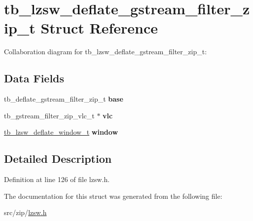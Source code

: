 \hypertarget{structtb__lzsw__deflate__gstream__filter__zip__t}{\section{tb\-\_\-lzsw\-\_\-deflate\-\_\-gstream\-\_\-filter\-\_\-zip\-\_\-t Struct Reference}
\label{structtb__lzsw__deflate__gstream__filter__zip__t}
}


Collaboration diagram for tb\-\_\-lzsw\-\_\-deflate\-\_\-gstream\-\_\-filter\-\_\-zip\-\_\-t\-:
\subsection*{Data Fields}
\begin{DoxyCompactItemize}
\item 
\hypertarget{structtb__lzsw__deflate__gstream__filter__zip__t_a88ab72778306daca97e52f5a60b6f95a}{tb\-\_\-deflate\-\_\-gstream\-\_\-filter\-\_\-zip\-\_\-t {\bfseries base}}\label{structtb__lzsw__deflate__gstream__filter__zip__t_a88ab72778306daca97e52f5a60b6f95a}

\item 
\hypertarget{structtb__lzsw__deflate__gstream__filter__zip__t_a203172e33d71cc8384f4b314be8c857d}{tb\-\_\-gstream\-\_\-filter\-\_\-zip\-\_\-vlc\-\_\-t $\ast$ {\bfseries vlc}}\label{structtb__lzsw__deflate__gstream__filter__zip__t_a203172e33d71cc8384f4b314be8c857d}

\item 
\hypertarget{structtb__lzsw__deflate__gstream__filter__zip__t_a6426b6eae79f2c20aad6847d408aad2b}{\hyperlink{structtb__lzsw__deflate__window__t}{tb\-\_\-lzsw\-\_\-deflate\-\_\-window\-\_\-t} {\bfseries window}}\label{structtb__lzsw__deflate__gstream__filter__zip__t_a6426b6eae79f2c20aad6847d408aad2b}

\end{DoxyCompactItemize}


\subsection{Detailed Description}


Definition at line 126 of file lzsw.\-h.



The documentation for this struct was generated from the following file\-:\begin{DoxyCompactItemize}
\item 
src/zip/\hyperlink{lzsw_8h}{lzsw.\-h}\end{DoxyCompactItemize}
